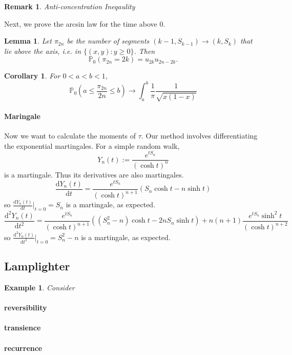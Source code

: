 \documentclass{article}
\newtheorem{Cor}{Corollary}[Thm]
\newtheorem{Lem}{Lemma}[section]
\newtheorem{Eg}{Example}[section]
\newtheorem*{Rk}{Remark}
\theoremstyle{definition}
\newcommand{\PP}{\mathbb{P}}
\renewcommand{\leq}{\leqslant}
\renewcommand{\geq}{\geqslant}
\newcommand{\<}{\left\langle}
\renewcommand{\>}{\right\rangle}
\begin{document}
\begin{Rk}
    Anti-concentration Ineqaulity
\end{Rk}

Next, we prove the arcsin law for the time above 0.
\begin{Lem}
    Let $\pi_{2n}$ be the number of segments $(k-1,S_{k-1})\to (k,S_k)$ that lie above the axis, i.e. in $\{(x,y):y\geq 0\}$. Then 
    \[ \PP_0(\pi_{2n}=2k)=u_{2k}u_{2n-2k}. \]
\end{Lem}
\begin{Cor}
    For $0<a<b<1$,
    \[ \PP_0(a\leq \frac{\pi_{2n}}{2n}\leq b)\to \int_{a}^{b}\frac{1}{\pi}\frac{1}{\sqrt{x(1-x)}}\]
\end{Cor}

\paragraph{Maringale} Now we want to calculate the moments of $\tau$. Our method involves differentiating the exponential martingales.
For a simple random walk, 
\[Y_n(t):=\frac{e^{tS_n}}{(\cosh t)^n} \]
is a martingale. Thus its derivatives are also martingales.
\[\frac{\mathrm{d} Y_n(t)}{\mathrm{d} t}=\frac{e^{tS_n}}{(\cosh t)^{n+1}}(S_n\cosh t - n\sinh t)\]
so $\frac{\mathrm{d} Y_n(t)}{\mathrm{d} t}|_{t=0}=S_n$ is a martingale, as expected.
\[\frac{\mathrm{d}^2 Y_n(t)}{\mathrm{d} t^2}=\frac{e^{tS_n}}{(\cosh t)^{n+1}}((S_n^2-n)\cosh t - 2nS_n\sinh t)+n(n+1)\frac{e^{tS_n}\sinh^2t}{(\cosh t)^{n+2}} \]
so $\frac{\mathrm{d}^2 Y_n(t)}{\mathrm{d} t^2}|_{t=0}=S_n^2-n$ is a martingale, as expected.

\subsection{Lamplighter}

\begin{Eg}
    Consider
\end{Eg}

\paragraph{reversibility}

\paragraph{transience}

\paragraph{recurrence}
\end{document}

